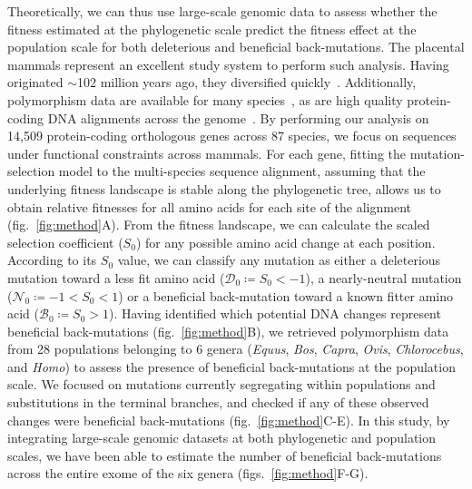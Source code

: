 \documentclass{article}
\newcommand{\Sphy}{S_{0}}
\newcommand{\SphyDel}{\mathcal{D}_0}
\newcommand{\SphyNeu}{\mathcal{N}_0}
\newcommand{\SphyBen}{\mathcal{B}_0}
\begin{document}
    Theoretically, we can thus use large-scale genomic data to assess whether the fitness estimated at the phylogenetic scale predict the fitness effect at the population scale for both deleterious and beneficial back-mutations.
    The placental mammals represent an excellent study system to perform such analysis.
    Having originated $\sim$102 million years ago, they diversified quickly~\cite{foley_genomic_2023}.
    Additionally, polymorphism data are available for many species~\cite{howe_ensembl_2021}, as are high quality protein-coding DNA alignments across the genome~\cite{ranwez_orthomam_2007, scornavacca_orthomam_2019}.
    By performing our analysis on 14,509 protein-coding orthologous genes across 87 species, we focus on sequences under functional constraints across mammals.
    For each gene, fitting the mutation-selection model to the multi-species sequence alignment, assuming that the underlying fitness landscape is stable along the phylogenetic tree, allows us to obtain relative fitnesses for all amino acids for each site of the alignment (fig.~\ref{fig:method}A).
    From the fitness landscape, we can calculate the scaled selection coefficient ($\Sphy$) for any possible amino acid change at each position.
    According to its $\Sphy$ value, we can classify any mutation as either a deleterious mutation toward a less fit amino acid ($\SphyDel \coloneqq \Sphy < -1$), a nearly-neutral mutation ($\SphyNeu \coloneqq -1 < \Sphy <1$) or a beneficial back-mutation toward a known fitter amino acid ($\SphyBen \coloneqq \Sphy > 1$).
    Having identified which potential DNA changes represent beneficial back-mutations (fig.~\ref{fig:method}B), we retrieved polymorphism data from 28 populations belonging to 6 genera (\textit{Equus}, \textit{Bos}, \textit{Capra}, \textit{Ovis}, \textit{Chlorocebus}, and \textit{Homo}) to assess the presence of beneficial back-mutations at the population scale.
    We focused on mutations currently segregating within populations and substitutions in the terminal branches, and checked if any of these observed changes were beneficial back-mutations (fig.~\ref{fig:method}C-E).
    In this study, by integrating large-scale genomic datasets at both phylogenetic and population scales, we have been able to estimate the number of beneficial back-mutations across the entire exome of the six genera (figs.~\ref{fig:method}F-G).
\end{document}
